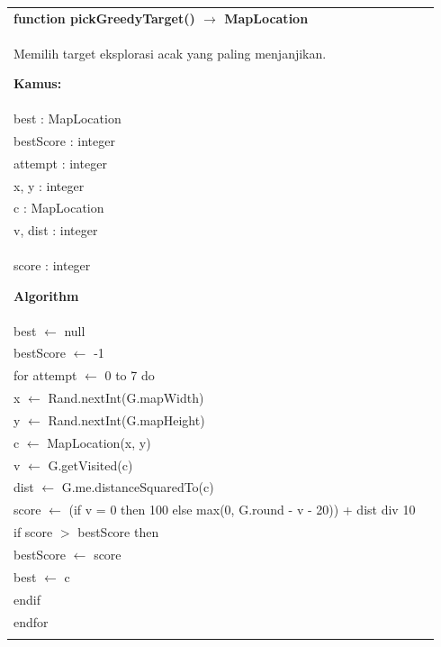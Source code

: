 \documentclass{article}
\newenvironment{pseudobox}
{
\centering
\begin{longtable}{|p{0.94\linewidth}|}
\hline
}
{
\\ \hline
\end{longtable}
\vspace{0.05cm}
}
\begin{document}
\begin{pseudobox}
\textbf{function pickGreedyTarget() $\rightarrow$ MapLocation} \\
{ Memilih target eksplorasi acak yang paling menjanjikan. }

\textbf{Kamus:} \\
\hspace*{1em} best : MapLocation \\
\hspace*{1em} bestScore : integer \\
\hspace*{1em} attempt : integer \\
\hspace*{1em} x, y : integer \\
\hspace*{1em} c : MapLocation \\
\hspace*{1em} v, dist : integer \\
\hspace*{1em} score : integer

\textbf{Algorithm} \\
\hspace*{1em} best $\leftarrow$ null \\
\hspace*{1em} bestScore $\leftarrow$ -1 \\

\hspace*{1em} for attempt $\leftarrow$ 0 to 7 do \\
\hspace*{2em} x $\leftarrow$ Rand.nextInt(G.mapWidth) \\
\hspace*{2em} y $\leftarrow$ Rand.nextInt(G.mapHeight) \\
\hspace*{2em} c $\leftarrow$ MapLocation(x, y) \\

\hspace*{2em} v $\leftarrow$ G.getVisited(c) \\
\hspace*{2em} dist $\leftarrow$ G.me.distanceSquaredTo(c) \\
\hspace*{2em} score $\leftarrow$ (if v = 0 then 100 else max(0, G.round - v - 20)) + dist div 10 \\

\hspace*{2em} if score $>$ bestScore then \\
\hspace*{3em} bestScore $\leftarrow$ score \\
\hspace*{3em} best $\leftarrow$ c \\
\hspace*{2em} endif \\
\hspace*{1em} endfor \\


\end{pseudobox}
\end{document}
